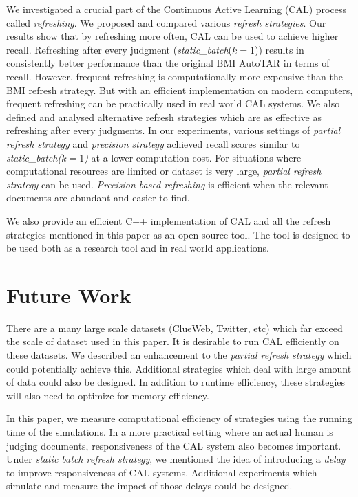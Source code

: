 \label{chap:conclusion}
We investigated a crucial part of the Continuous Active Learning (CAL) process
called \textit{refreshing}. We proposed and compared various \textit{refresh
strategies}. Our results show that by refreshing more often, CAL can be used to
achieve higher recall. Refreshing after every judgment (\textit{static\_batch}($k
= 1$)) results in consistently better performance than the original BMI AutoTAR
in terms of recall. However, frequent refreshing is computationally more
expensive than the BMI refresh
strategy. But with an efficient implementation on modern computers, frequent
refreshing can be practically used in real world CAL systems.  We also defined and
analysed alternative refresh strategies which are as effective as refreshing
after every judgments. In our experiments, various settings of \textit{partial refresh
strategy} and \textit{precision strategy} achieved recall scores similar to
\textit{static\_batch($k = 1$)} at a lower computation cost. For situations
where computational resources are limited or dataset is very large,
\textit{partial refresh strategy} can be used. \textit{Precision based
refreshing} is efficient when the relevant documents are abundant and easier to
find.

We also provide an efficient C++ implementation of CAL and all the refresh
strategies mentioned in this paper as an open source tool. The tool is designed
to be used both as a research tool and in real world applications.


\section{Future Work}
There are a many large scale datasets (ClueWeb, Twitter, etc) which far exceed
the scale of dataset used in this paper.  It is desirable to run CAL efficiently on
these datasets. We described an enhancement to the \textit{partial refresh
strategy} which could potentially achieve this. Additional strategies which deal
with large amount of data could also be designed. In addition to
runtime efficiency, these strategies will also need to optimize for memory
efficiency.

In this paper, we measure computational efficiency of strategies using the
running time of the simulations. In a more practical setting where an actual
human is judging documents, responsiveness of the CAL system also becomes
important.  Under \textit{static batch refresh strategy}, we mentioned the idea
of introducing a \textit{delay} to improve responsiveness of CAL systems. Additional
experiments which simulate and measure the impact of those delays could be
designed.

